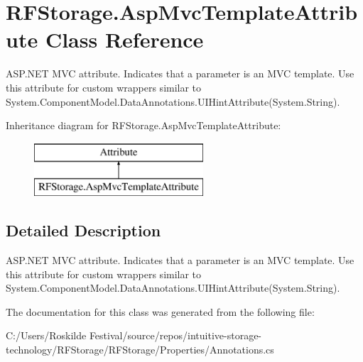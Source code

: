 \hypertarget{class_r_f_storage_1_1_asp_mvc_template_attribute}{}\section{R\+F\+Storage.\+Asp\+Mvc\+Template\+Attribute Class Reference}
\label{class_r_f_storage_1_1_asp_mvc_template_attribute}


A\+S\+P.\+N\+ET M\+VC attribute. Indicates that a parameter is an M\+VC template. Use this attribute for custom wrappers similar to {\ttfamily System.\+Component\+Model.\+Data\+Annotations.\+U\+I\+Hint\+Attribute(System.\+String)}.  


Inheritance diagram for R\+F\+Storage.\+Asp\+Mvc\+Template\+Attribute\+:\begin{figure}[H]
\begin{center}
\leavevmode
\includegraphics[height=2.000000cm]{class_r_f_storage_1_1_asp_mvc_template_attribute}
\end{center}
\end{figure}


\subsection{Detailed Description}
A\+S\+P.\+N\+ET M\+VC attribute. Indicates that a parameter is an M\+VC template. Use this attribute for custom wrappers similar to {\ttfamily System.\+Component\+Model.\+Data\+Annotations.\+U\+I\+Hint\+Attribute(System.\+String)}. 



The documentation for this class was generated from the following file\+:\begin{DoxyCompactItemize}
\item 
C\+:/\+Users/\+Roskilde Festival/source/repos/intuitive-\/storage-\/technology/\+R\+F\+Storage/\+R\+F\+Storage/\+Properties/Annotations.\+cs\end{DoxyCompactItemize}
